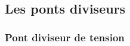 \documentclass[../../main/main.tex]{subfiles}
\begin{document}
\begin{tcb*}[breakable]
\begin{isd}
{\begin{align*}
			\end{align*}
		}%
		\vspace{-15pt}
	\end{isd}
	\vspace{-20pt}
	\tcblower
	\begin{center}
	\end{center}
	\vspace{-30pt}
\end{tcb*}

\subsection{Les ponts diviseurs}


\subsubsection{Pont diviseur de tension}
\end{document}
